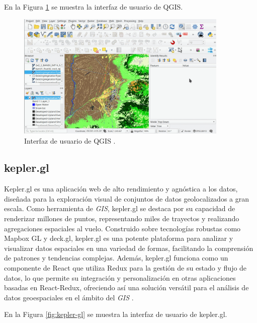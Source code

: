 En la Figura \ref{fig:qgis-screenshot} se muestra la interfaz de usuario de QGIS.

\begin{figure}[!htbp]
  \centering
  \includegraphics[width=0.9\textwidth]{imagenes/02-marco-teorico/qgis-screenshot.png}
  \caption[Interfaz de usuario de QGIS]{Interfaz de usuario de QGIS \cite{alonso_2023_qgis}.}
  \label{fig:qgis-screenshot}
\end{figure}

\subsection{kepler.gl}
Kepler.gl es una aplicación web de alto rendimiento y agnóstica a los datos,
diseñada para la exploración visual de conjuntos de datos geolocalizados a gran
escala. Como herramienta de \textit{GIS}, kepler.gl se destaca por su capacidad
de renderizar millones de puntos, representando miles de trayectos y realizando
agregaciones espaciales al vuelo. Construido sobre tecnologías robustas como
Mapbox GL y deck.gl, kepler.gl es una potente plataforma para analizar y visualizar
datos espaciales en una variedad de formas, facilitando la comprensión de patrones
y tendencias complejas. Además, kepler.gl funciona como un componente de React que
utiliza Redux para la gestión de su estado y flujo de datos, lo que permite su
integración y personalización en otras aplicaciones basadas en React-Redux,
ofreciendo así una solución versátil para el análisis de datos geoespaciales en el
ámbito del \textit{GIS} \cite{kepler_gl_docs}.

En la Figura \ref{fig:kepler-gl} se muestra la interfaz de usuario de kepler.gl.

